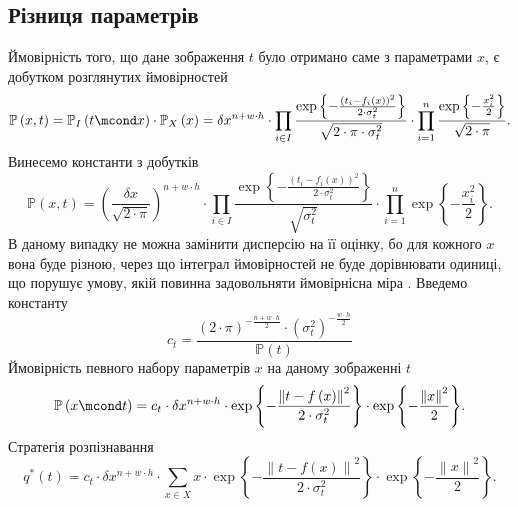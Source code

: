 \subsection{Різниця параметрів}

Ймовірність того,
що дане зображення $t$ було отримано саме з параметрами $x$,
є добутком розглянутих ймовірностей
\begin{equation*}
  \mathbb{P}\left( x, t \right)
  = \mathbb{P}_I\left( t \mcond x \right)
    \cdot \mathbb{P}_X\left( x \right)
  = \delta x^{n + w \cdot h} \cdot \prod_{i \in I}
  \frac{\exp{\left\{ - \frac{\left( t_i - f_i\left( x \right) \right)^2}
       {2 \cdot \sigma_t^2} \right\}}}{\sqrt{2 \cdot \pi \cdot \sigma_t^2}}
  \cdot
  \prod_{i=1}^n
  \frac{\exp{\left\{ - \frac{x_i^2}{2} \right\}}}{\sqrt{2 \cdot \pi}}.
\end{equation*}
Винесемо константи з добутків
\begin{equation*}
  \mathbb{P}\left( x, t \right)
  = \left( \frac{\delta x}{\sqrt{2 \cdot \pi}} \right)^{n + w \cdot h}
    \cdot \prod_{i \in I}
    \frac{\exp{\left\{ - \frac{\left( t_i - f_i\left( x \right) \right)^2}
         {2 \cdot \sigma_t^2} \right\}}}{\sqrt{\sigma_t^2}}
    \cdot
    \prod_{i=1}^n
    \exp{\left\{ - \frac{x_i^2}{2} \right\}}.
\end{equation*}
В даному випадку не можна замінити дисперсію на її оцінку,
бо для кожного $x$ вона буде різною,
через що інтеграл ймовірностей не буде дорівнювати одиниці,
що порушує умову, якій повинна задовольняти ймовірнісна міра
\cite{dorogovtsev:1989}.
Введемо константу
\begin{equation*}
  c_t = \frac{
      \left( 2 \cdot \pi \right)^{- \frac{n + w \cdot h}{2}}
      \cdot \left( \sigma_t^2 \right)^{- \frac{w \cdot h}{2}}
    }{\mathbb{P}\left( t \right)}
\end{equation*}
Ймовірність певного набору параметрів $x$ на даному зображенні $t$
\begin{equation*}
  \mathbb{P}\left( x \mcond t \right)
  = c_t \cdot \delta x^{n + w \cdot h}
    \cdot \exp{\left\{ - \frac{\left\| t - f\left( x \right) \right\|^2}
                              {2 \cdot \sigma_t^2} \right\}}
    \cdot \exp{\left\{ - \frac{\left\| x \right\|^2}{2} \right\}}.
\end{equation*}
Стратегія розпізнавання
\begin{equation*}
  q^* \left( t \right)
  = c_t \cdot \delta x^{n + w \cdot h}
    \cdot \sum_{x \in X}
      x
      \cdot \exp{\left\{ - \frac{\left\| t - f\left( x \right) \right\|^2}
                                {2 \cdot \sigma_t^2} \right\}}
      \cdot \exp{\left\{ - \frac{\left\| x \right\|^2}{2} \right\}}.
\end{equation*}
